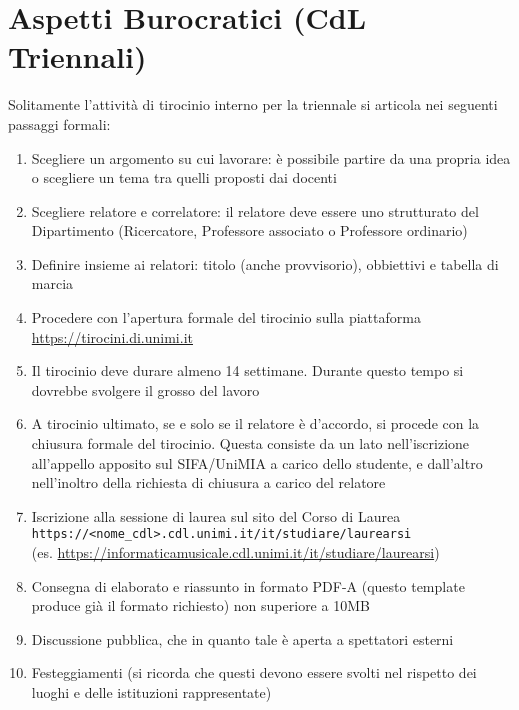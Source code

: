 \documentclass[12pt]{report}
\begin{document}
\section{Aspetti Burocratici (CdL Triennali)}
Solitamente l'attività di tirocinio interno per la triennale si articola nei seguenti passaggi formali:
\begin{enumerate}
    \item Scegliere un argomento su cui lavorare: è possibile partire da una propria idea o scegliere un tema tra quelli proposti dai docenti
    \item Scegliere relatore e correlatore: il relatore deve essere uno strutturato del Dipartimento (Ricercatore, Professore associato o Professore ordinario)
    \item Definire insieme ai relatori: titolo (anche provvisorio), obbiettivi e tabella di marcia
    \item Procedere con l'apertura formale del tirocinio sulla piattaforma\\ \url{https://tirocini.di.unimi.it}
    \item Il tirocinio deve durare almeno 14 settimane. Durante questo tempo si dovrebbe svolgere il grosso del lavoro
    \item A tirocinio ultimato, se e solo se il relatore è d'accordo, si procede con la chiusura formale del tirocinio. Questa consiste da un lato nell'iscrizione all'appello apposito sul SIFA/UniMIA a carico dello studente, e dall'altro nell'inoltro della richiesta di chiusura a carico del relatore
    \item Iscrizione alla sessione di laurea sul sito del Corso di Laurea\\ \texttt{https://<nome\_cdl>.cdl.unimi.it/it/studiare/laurearsi}\\ (es. \url{https://informaticamusicale.cdl.unimi.it/it/studiare/laurearsi})
    \item Consegna di elaborato e riassunto in formato PDF-A (questo template produce già il formato richiesto) non superiore a 10MB
    \item Discussione pubblica, che in quanto tale è aperta a spettatori esterni
    \item Festeggiamenti (si ricorda che questi devono essere svolti nel rispetto dei luoghi e delle istituzioni rappresentate)
\end{enumerate}
\end{document}
